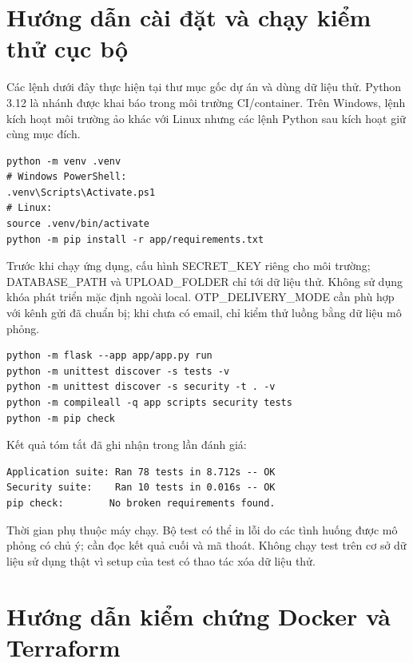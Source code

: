 \chapter{Hướng dẫn cài đặt và chạy kiểm thử cục bộ}
Các lệnh dưới đây thực hiện tại thư mục gốc dự án và dùng dữ liệu thử. Python 3.12 là nhánh được khai báo trong môi trường CI/container. Trên Windows, lệnh kích hoạt môi trường ảo khác với Linux nhưng các lệnh Python sau kích hoạt giữ cùng mục đích.
\begin{verbatim}
python -m venv .venv
# Windows PowerShell:
.venv\Scripts\Activate.ps1
# Linux:
source .venv/bin/activate
python -m pip install -r app/requirements.txt
\end{verbatim}
Trước khi chạy ứng dụng, cấu hình SECRET\_KEY riêng cho môi trường; DATABASE\_PATH và UPLOAD\_FOLDER chỉ tới dữ liệu thử. Không sử dụng khóa phát triển mặc định ngoài local. OTP\_DELIVERY\_MODE cần phù hợp với kênh gửi đã chuẩn bị; khi chưa có email, chỉ kiểm thử luồng bằng dữ liệu mô phỏng.
\begin{verbatim}
python -m flask --app app/app.py run
python -m unittest discover -s tests -v
python -m unittest discover -s security -t . -v
python -m compileall -q app scripts security tests
python -m pip check
\end{verbatim}
Kết quả tóm tắt đã ghi nhận trong lần đánh giá:
\begin{verbatim}
Application suite: Ran 78 tests in 8.712s -- OK
Security suite:    Ran 10 tests in 0.016s -- OK
pip check:        No broken requirements found.
\end{verbatim}
Thời gian phụ thuộc máy chạy. Bộ test có thể in lỗi do các tình huống được mô phỏng có chủ ý; cần đọc kết quả cuối và mã thoát. Không chạy test trên cơ sở dữ liệu sử dụng thật vì setup của test có thao tác xóa dữ liệu thử.

\chapter{Hướng dẫn kiểm chứng Docker và Terraform}
